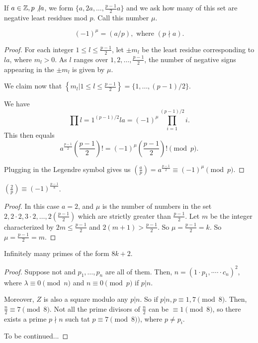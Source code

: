 \documentclass{article}
\begin{document}
If $a\in\mathbb Z, p \not \vert a$, we form $\{a, 2a, \ldots, \frac{p-1}{2} a\}$ and we ask how many of this set are negative least residues mod $p$. Call this number $\mu$.

\begin{lemma} 
	\[(-1)^\mu = (a / p), \text{ where } (p \nmid a).\]
\end{lemma}

\begin{proof}
	For each integer $1 \leq l \leq \frac{p-1}{2}$, let $\pm m_l$ be the least residue corresponding to $la$, where $m_l > 0$. As $l$ ranges over $1, 2, \ldots, \frac{p-1}{2}$, the number of negative signs appearing in the $\pm m_l$ is given by $\mu$.

	We claim now that $\left\{m_l | 1 \leq l \leq \frac{p-1}{2}\right\} = \{1, \ldots, (p-1)/2\}$. 

	We have \[\prod{l = 1}^{(p-1)/2} la = (-1)^\mu \prod_{i = 1}^{(p-1)/2} i.\] 
	This then equals \[a^{\frac{p-1}{2}} \left(\frac{p-1}{2}\right)! = (-1)^\mu \left(\frac{p-1}{2}\right)! \pmod p.\] 

	Plugging in the Legendre symbol gives us $\left(\frac{a}{p}\right) = a^{\frac{p-1}{2}} \equiv (-1)^\mu \pmod p$.
\end{proof}

\begin{proposition}
	$\left(\frac{2}{p}\right) \equiv (-1)^{\frac{p-1}{8}}$. 
\end{proposition}

\begin{proof}
	In this case $a = 2$, and $\mu$ is the number of numbers in the set $2, 2 \cdot 2, 3 \cdot 2, \ldots, 2\left(\frac{p-1}{2}\right)$
	which are strictly greater than $\frac{p-1}{2}$. Let $m$ be the integer characterized by 
	$2m \leq \frac{p-1}{2}$ and $2(m + 1) > \frac{p-1}{2}$. So $\mu = \frac{p-1}{2}= k$. So $\mu = \frac{p-1}{2} = m$.
\end{proof}

\begin{corollary}
	Infinitely many primes of the form $8k + 2$.
\end{corollary}

\begin{proof}
	Suppose not and $p_1, \ldots, p_n$ are all of them. Then, $n = (1 \cdot p_1, \cdot \cdots \cdot c_n)^2$, where $\lambda \equiv 0 \pmod n$ and $ n \equiv 0 \pmod p$ if $p | n$.

	Moreover, $Z$ is also a square modulo any $p | n$. So if $p | n, p \equiv 1, 7 \pmod 8$. Then, $\frac{n}{2} \equiv 7 \pmod 8$. Not all the prime divisors of $\frac{n}{2}$ can be $\equiv 1 \pmod 8$, so there exists a prime $p \nmid n$ such tat $p \equiv 7 \pmod 8)$, where $p \neq p_i$. 

	To be continued...
\end{proof}
\end{document}
